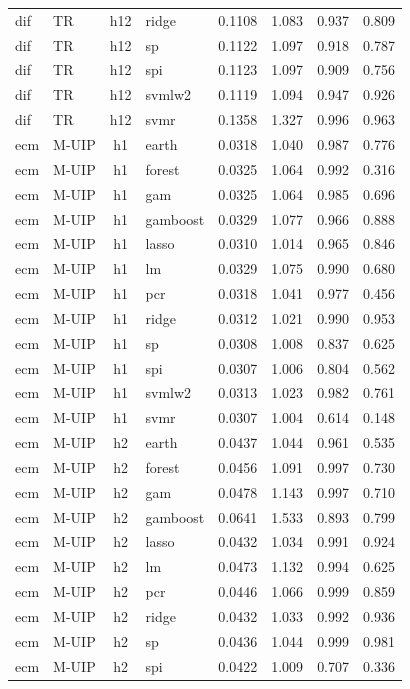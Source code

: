 \begin{ThreePartTable}
\begin{longtable}[t]{llclcccc}
dif & TR & h12 & ridge & 0.1108 & 1.083 & 0.937 & 0.809\\
dif & TR & h12 & sp & 0.1122 & 1.097 & 0.918 & 0.787\\
dif & TR & h12 & spi & 0.1123 & 1.097 & 0.909 & 0.756\\
dif & TR & h12 & svmlw2 & 0.1119 & 1.094 & 0.947 & 0.926\\
dif & TR & h12 & svmr & 0.1358 & 1.327 & 0.996 & 0.963\\
\addlinespace
ecm & M-UIP & h1 & earth & 0.0318 & 1.040 & 0.987 & 0.776\\
ecm & M-UIP & h1 & forest & 0.0325 & 1.064 & 0.992 & 0.316\\
ecm & M-UIP & h1 & gam & 0.0325 & 1.064 & 0.985 & 0.696\\
ecm & M-UIP & h1 & gamboost & 0.0329 & 1.077 & 0.966 & 0.888\\
ecm & M-UIP & h1 & lasso & 0.0310 & 1.014 & 0.965 & 0.846\\
ecm & M-UIP & h1 & lm & 0.0329 & 1.075 & 0.990 & 0.680\\
ecm & M-UIP & h1 & pcr & 0.0318 & 1.041 & 0.977 & 0.456\\
ecm & M-UIP & h1 & ridge & 0.0312 & 1.021 & 0.990 & 0.953\\
ecm & M-UIP & h1 & sp & 0.0308 & 1.008 & 0.837 & 0.625\\
ecm & M-UIP & h1 & spi & 0.0307 & 1.006 & 0.804 & 0.562\\
ecm & M-UIP & h1 & svmlw2 & 0.0313 & 1.023 & 0.982 & 0.761\\
ecm & M-UIP & h1 & svmr & 0.0307 & 1.004 & 0.614 & 0.148\\
\addlinespace
ecm & M-UIP & h2 & earth & 0.0437 & 1.044 & 0.961 & 0.535\\
ecm & M-UIP & h2 & forest & 0.0456 & 1.091 & 0.997 & 0.730\\
ecm & M-UIP & h2 & gam & 0.0478 & 1.143 & 0.997 & 0.710\\
ecm & M-UIP & h2 & gamboost & 0.0641 & 1.533 & 0.893 & 0.799\\
ecm & M-UIP & h2 & lasso & 0.0432 & 1.034 & 0.991 & 0.924\\
ecm & M-UIP & h2 & lm & 0.0473 & 1.132 & 0.994 & 0.625\\
ecm & M-UIP & h2 & pcr & 0.0446 & 1.066 & 0.999 & 0.859\\
ecm & M-UIP & h2 & ridge & 0.0432 & 1.033 & 0.992 & 0.936\\
ecm & M-UIP & h2 & sp & 0.0436 & 1.044 & 0.999 & 0.981\\
ecm & M-UIP & h2 & spi & 0.0422 & 1.009 & 0.707 & 0.336\\

\end{longtable}
\end{ThreePartTable}
